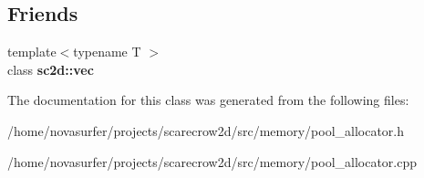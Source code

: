 \subsection*{Friends}
\begin{DoxyCompactItemize}
\item 
\mbox{\label{classsc2d_1_1memory_1_1pool__allocator_a2e04baf33c43689ad08746f193cb306c}} 
{\footnotesize template$<$typename T $>$ }\\class {\bfseries sc2d\+::vec}
\end{DoxyCompactItemize}


The documentation for this class was generated from the following files\+:\begin{DoxyCompactItemize}
\item 
/home/novasurfer/projects/scarecrow2d/src/memory/pool\+\_\+allocator.\+h\item 
/home/novasurfer/projects/scarecrow2d/src/memory/pool\+\_\+allocator.\+cpp\end{DoxyCompactItemize}
